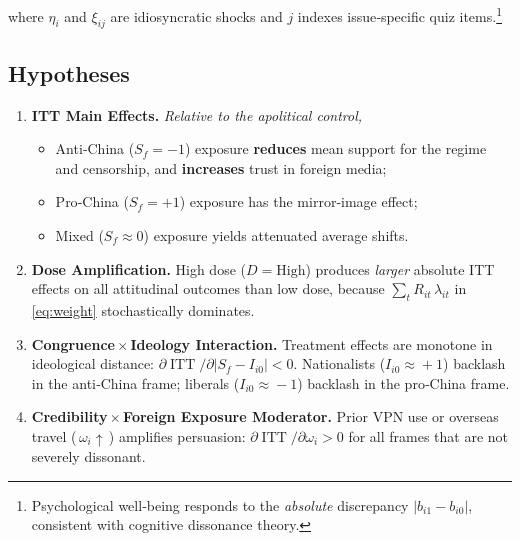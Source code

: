 \documentclass[12pt, american]{article}
\begin{document}
%
where $\eta_i$ and $\xi_{ij}$ are idiosyncratic shocks and $j$ indexes
issue‐specific quiz items.\footnote{Psychological well‐being responds to the
\emph{absolute} discrepancy $|b_{i1}-b_{i0}|$, consistent with cognitive
dissonance theory.}

\subsection{Hypotheses}

\begin{enumerate}[label=\textbf{H\arabic*}, leftmargin=1.25cm]

\item \textbf{ITT Main Effects.} \emph{Relative to the apolitical control,}
      \begin{itemize}[noitemsep]
        \item Anti‐China ($S_f=-1$) exposure \textbf{reduces}
              mean support for the regime and censorship, and
              \textbf{increases} trust in foreign media;
        \item Pro‐China ($S_f=+1$) exposure has the mirror‐image effect;
        \item Mixed ($S_f\approx0$) exposure yields attenuated average shifts.
      \end{itemize}

\item \textbf{Dose Amplification.}
      High dose ($D=\text{High}$) produces \emph{larger} absolute ITT effects
      on all attitudinal outcomes than low dose, because
      $\sum_{t} R_{it}\,\lambda_{it}$ in \eqref{eq:weight} stochastically
      dominates.

\item \textbf{Congruence\,${\times}$\,Ideology Interaction.}
      Treatment effects are monotone in ideological distance:
      $\partial\!\operatorname{ITT}/\partial|S_f-I_{i0}|<0$.
      Nationalists ($I_{i0}\!\approx\!+1$) backlash in the anti‐China frame;
      liberals ($I_{i0}\!\approx\!-1$) backlash in the pro‐China frame.

\item \textbf{Credibility\,${\times}$\,Foreign Exposure Moderator.}
      Prior VPN use or overseas travel (\,$\omega_i\uparrow$\,) amplifies
      persuasion: $\partial\!\operatorname{ITT}/\partial\omega_i>0$ for all
      frames that are not severely dissonant.


\end{enumerate}
\end{document}
